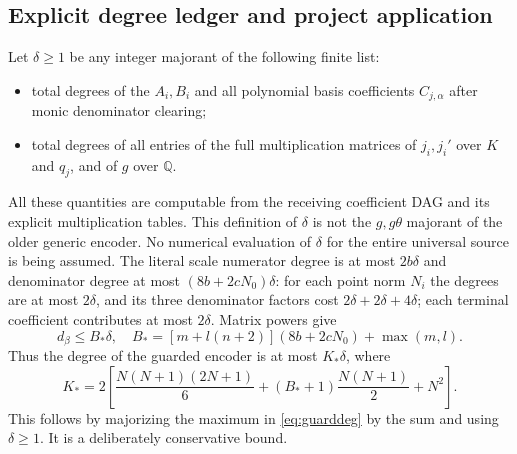 \documentclass[11pt]{article}
\newcommand{\Q}{\mathbb Q}\newcommand{\Z}{\mathbb Z}\newcommand{\N}{\mathbb N}
\begin{document}
\subsection{Explicit degree ledger and project application}
Let $\delta\ge1$ be any integer majorant of the following finite list:
\begin{itemize}
\item total degrees of the $A_i,B_i$ and all polynomial basis coefficients
$C_{j,\alpha}$ after monic denominator clearing;
\item total degrees of all entries of the full multiplication matrices
of $j_i,j_i'$ over $K$ and $q_j$, and of $g$ over $\Q$.
\end{itemize}
All these quantities are computable from the receiving coefficient
DAG and its explicit multiplication tables. This definition of
$\delta$ is not the $g,g\theta$ majorant of the older generic encoder.
No numerical evaluation of $\delta$ for the entire universal source
is being assumed. The literal scale numerator degree is at most
$2b\delta$ and denominator degree at most $(8b+2cN_0)\delta$:
for each point norm $N_i$ the degrees are at most $2\delta$, and its
three denominator factors cost $2\delta+2\delta+4\delta$; each terminal
coefficient contributes at most $2\delta$. Matrix powers give
\begin{equation}\label{eq:beta-degree}
 d_\beta\le B_*\delta,\quad
 B_*=[m+l(n+2)](8b+2cN_0)+\max(m,l).
\end{equation}
Thus the degree of the guarded encoder is at most $K_*\delta$, where
\begin{equation}\label{eq:degreeK}
 K_*=2\left[\frac{N(N+1)(2N+1)}6
 +(B_*+1)\frac{N(N+1)}2+N^2\right].
\end{equation}
This follows by majorizing the maximum in \eqref{eq:guarddeg} by the
sum and using $\delta\ge1$. It is a deliberately conservative bound.
\end{document}
